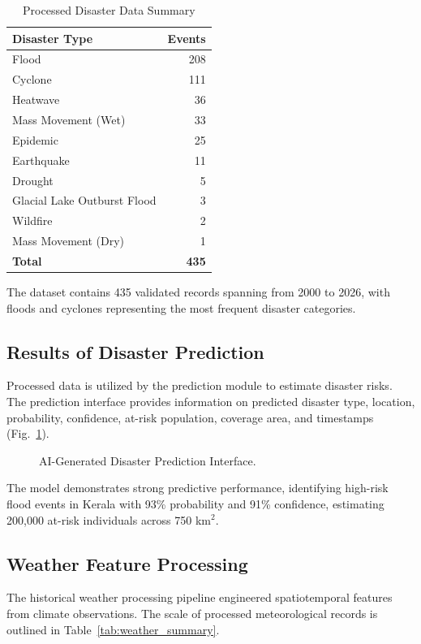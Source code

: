 \documentclass[conference]{IEEEtran}
\begin{document}
\begin{table}[htbp]
\centering
\caption{Processed Disaster Data Summary}
\label{tab:disaster_data}
\begin{tabular}{lr}
\toprule
\textbf{Disaster Type} & \textbf{Events} \\
\midrule
Flood & 208 \\
Cyclone & 111 \\
Heatwave & 36 \\
Mass Movement (Wet) & 33 \\
Epidemic & 25 \\
Earthquake & 11 \\
Drought & 5 \\
Glacial Lake Outburst Flood & 3 \\
Wildfire & 2 \\
Mass Movement (Dry) & 1 \\
\midrule
\textbf{Total} & \textbf{435} \\
\bottomrule
\end{tabular}
\end{table}

The dataset contains 435 validated records spanning from 2000 to 2026, with floods and cyclones representing the most frequent disaster categories.

\subsection{Results of Disaster Prediction}
Processed data is utilized by the prediction module to estimate disaster risks. The prediction interface provides information on predicted disaster type, location, probability, confidence, at-risk population, coverage area, and timestamps (Fig.~\ref{fig:prediction}).

\begin{figure}[htbp]
\centering
\fbox{\rule{0pt}{1.8in} \rule{0.9\linewidth}{0pt}}
\caption{AI-Generated Disaster Prediction Interface.}
\label{fig:prediction}
\end{figure}

The model demonstrates strong predictive performance, identifying high-risk flood events in Kerala with 93\% probability and 91\% confidence, estimating 200,000 at-risk individuals across 750 km$^2$.

\subsection{Weather Feature Processing}
The historical weather processing pipeline engineered spatiotemporal features from climate observations. The scale of processed meteorological records is outlined in Table~\ref{tab:weather_summary}.
\end{document}
